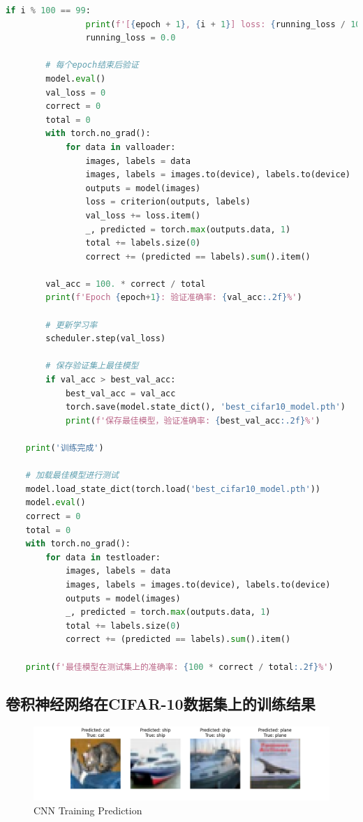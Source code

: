 \documentclass[UTF8]{report}
\theoremstyle{MyLineTheoremStyle} %
\theoremstyle{MyBlockTheoremStyle} %
\theoremstyle{MySubsubsectionStyle} %
\begin{document}
\begin{lstlisting}[language=python, caption={神经网络CNN训练（纯手写）}, label={lst:cnn_train_handwritten}]
            if i % 100 == 99:
                print(f'[{epoch + 1}, {i + 1}] loss: {running_loss / 100:.3f} | acc: {100.*correct/total:.2f}%')
                running_loss = 0.0
        
        # 每个epoch结束后验证
        model.eval()
        val_loss = 0
        correct = 0
        total = 0
        with torch.no_grad():
            for data in valloader:
                images, labels = data
                images, labels = images.to(device), labels.to(device)
                outputs = model(images)
                loss = criterion(outputs, labels)
                val_loss += loss.item()
                _, predicted = torch.max(outputs.data, 1)
                total += labels.size(0)
                correct += (predicted == labels).sum().item()
        
        val_acc = 100. * correct / total
        print(f'Epoch {epoch+1}: 验证准确率: {val_acc:.2f}%')
        
        # 更新学习率
        scheduler.step(val_loss)
        
        # 保存验证集上最佳模型
        if val_acc > best_val_acc:
            best_val_acc = val_acc
            torch.save(model.state_dict(), 'best_cifar10_model.pth')
            print(f'保存最佳模型，验证准确率: {best_val_acc:.2f}%')

    print('训练完成')

    # 加载最佳模型进行测试
    model.load_state_dict(torch.load('best_cifar10_model.pth'))
    model.eval()
    correct = 0
    total = 0
    with torch.no_grad():
        for data in testloader:
            images, labels = data
            images, labels = images.to(device), labels.to(device)
            outputs = model(images)
            _, predicted = torch.max(outputs.data, 1)
            total += labels.size(0)
            correct += (predicted == labels).sum().item()

    print(f'最佳模型在测试集上的准确率: {100 * correct / total:.2f}%')
\end{lstlisting}


\subsection{卷积神经网络在CIFAR-10数据集上的训练结果}


\begin{figure}[H]
    \centering
    \includegraphics[width=1.0\textwidth]{train2.png}
    \caption{CNN Training Prediction}
    \label{fig:cnn_validation_accuracy}
\end{figure}
\end{document}
